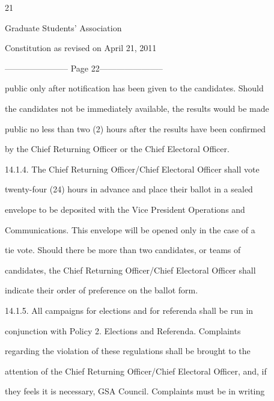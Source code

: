                                                 

                                             21  



                               Graduate Students’ Association  



                          Constitution as revised on April 21, 2011  


----------------------- Page 22-----------------------

        public only after notification has been given to the candidates. Should  

        the candidates not be immediately available, the results would be made  

        public no less than two (2) hours after the results have been confirmed  

        by the Chief Returning Officer or the Chief Electoral Officer.  



14.1.4.     The  Chief  Returning  Officer/Chief  Electoral  Officer  shall  vote  

        twenty-four  (24)  hours  in  advance  and  place  their  ballot  in  a  sealed  

        envelope  to  be  deposited  with  the  Vice  President  Operations  and  

        Communications. This envelope will be opened only in the case of a  

        tie  vote.  Should  there  be  more  than  two  candidates,  or  teams  of  

        candidates,  the  Chief  Returning  Officer/Chief  Electoral  Officer  shall  

        indicate their order of preference on the ballot form.  



14.1.5.     All  campaigns  for  elections  and  for  referenda  shall  be  run  in  

        conjunction   with   Policy   2.   Elections   and   Referenda.   Complaints  

        regarding  the  violation  of  these  regulations  shall  be  brought  to  the  

        attention of the Chief Returning Officer/Chief Electoral Officer, and, if  

        they feels it is necessary, GSA Council. Complaints must be in writing  

